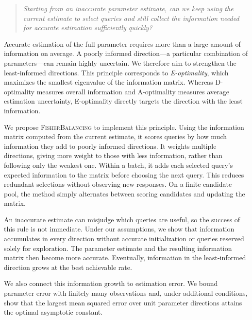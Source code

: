 \documentclass[10pt,twoside,letterpaper]{article}
\newcommand{\FB}{\textnormal{\textsc{FisherBalancing}}}
\begin{document}
\begin{quote}
\emph{Starting from an inaccurate parameter estimate, can we keep using
the current estimate to select queries and still collect the information needed
for accurate estimation sufficiently quickly?}
\end{quote}

Accurate estimation of the full parameter requires more than a large
amount of information on average. A poorly informed direction---a
particular combination of parameters---can remain highly uncertain. We
therefore aim to strengthen the least-informed directions. This principle
corresponds to \emph{E-optimality}, which maximizes the smallest eigenvalue
of the information matrix. Whereas D-optimality measures overall
information and A-optimality measures average estimation uncertainty,
E-optimality directly targets the direction with the least information.

We propose \FB{} to implement this principle. Using the information matrix
computed from the current estimate, it scores queries by how much
information they add to poorly informed directions. It weights multiple
directions, giving more weight to those with less information, rather than
following only the weakest one. Within a batch, it adds each selected
query's expected information to the matrix before choosing the next query.
This reduces redundant selections without observing new responses. On a
finite candidate pool, the method simply alternates between scoring
candidates and updating the matrix.

An inaccurate estimate can misjudge which queries are useful, so the
success of this rule is not immediate. Under our assumptions, we show
that information accumulates in every direction without accurate
initialization or queries reserved solely for exploration. The parameter
estimate and the resulting information matrix then become more accurate.
Eventually, information in the least-informed direction grows at the
best achievable rate.

We also connect this information growth to estimation error. We bound
parameter error with finitely many observations and, under additional
conditions, show that the largest mean squared error over unit parameter
directions attains the optimal asymptotic constant.
\end{document}
